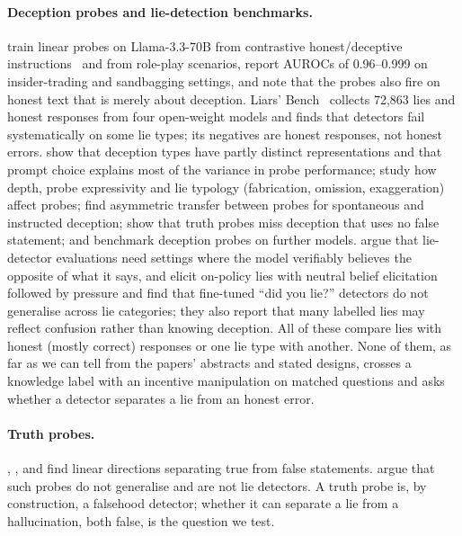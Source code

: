 \paragraph{Deception probes and lie-detection benchmarks.}
\citet{goldowskydill2025detecting} train linear probes on Llama-3.3-70B from contrastive honest/deceptive instructions~\citep{zou2023representation} and from role-play scenarios, report AUROCs of 0.96--0.999 on insider-trading and sandbagging settings, and note that the probes also fire on honest text that is merely about deception. Liars' Bench~\citep{kretschmar2025liarsbench} collects 72,863 lies and honest responses from four open-weight models and finds that detectors fail systematically on some lie types; its negatives are honest responses, not honest errors. \citet{natarajan2026oneprobe} show that deception types have partly distinct representations and that prompt choice explains most of the variance in probe performance; \citet{moustafa2026beyond} study how depth, probe expressivity and lie typology (fabrication, omission, exaggeration) affect probes; \citet{luikham2026asymmetries} find asymmetric transfer between probes for spontaneous and instructed deception; \citet{thormann2026probing} show that truth probes miss deception that uses no false statement; \citet{parrack2025benchmarking} and \citet{boxo2025caught} benchmark deception probes on further models. \citet{cooney2026didyoulie} argue that lie-detector evaluations need settings where the model verifiably believes the opposite of what it says, and \citet{hopkins2026finetuned} elicit on-policy lies with neutral belief elicitation followed by pressure and find that fine-tuned ``did you lie?'' detectors do not generalise across lie categories; they also report that many labelled lies may reflect confusion rather than knowing deception. All of these compare lies with honest (mostly correct) responses or one lie type with another. None of them, as far as we can tell from the papers' abstracts and stated designs, crosses a knowledge label with an incentive manipulation on matched questions and asks whether a detector separates a lie from an honest error.

\paragraph{Truth probes.}
\citet{azaria2023internal}, \citet{burns2022discovering}, \citet{marks2023geometry} and \citet{burger2024truth} find linear directions separating true from false statements. \citet{levinstein2023still} argue that such probes do not generalise and are not lie detectors. A truth probe is, by construction, a falsehood detector; whether it can separate a lie from a hallucination, both false, is the question we test.

